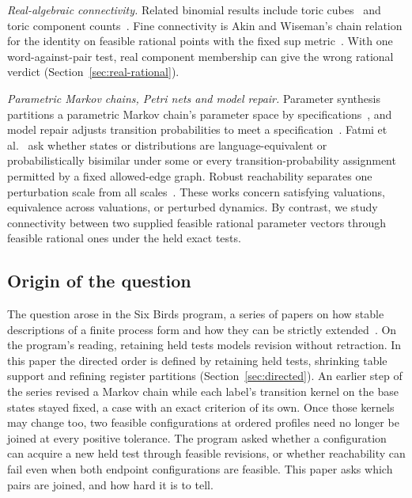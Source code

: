 \emph{Real-algebraic connectivity.} Related binomial results include toric
cubes~\cite{toriccubes,basugabrielovvorobjov} and toric component
counts~\cite{soprunovasottile}. Fine connectivity is Akin and Wiseman's chain
relation for the identity on feasible rational points with the fixed sup
metric~\cite[Section~3]{akinwiseman}. With one word-against-pair test, real
component membership can give the wrong rational verdict
(Section~\ref{sec:real-rational}).

\emph{Parametric Markov chains, Petri nets and model repair.} Parameter
synthesis partitions a parametric Markov chain's parameter space by
specifications~\cite{jungesetal2019,hutschenreiterbaierklein}, and model
repair adjusts transition probabilities to meet a specification~\cite{ceska}.
Fatmi et al.~\cite{fatmikiefermainparker} ask whether states or distributions
are language-equivalent or probabilistically bisimilar under some or every
transition-probability assignment permitted by a fixed allowed-edge graph.
Robust reachability separates one perturbation scale from all
scales~\cite{asarinbouajjani,bournezgracahainry,blancbournez,blanc}. These
works concern satisfying valuations, equivalence across valuations, or
perturbed dynamics. By contrast, we study connectivity between two supplied
feasible rational parameter vectors through feasible rational ones under the
held exact tests.

\subsection{Origin of the question}\label{sec:origin}

The question arose in the Six Birds program, a series of papers on how
stable descriptions of a finite process form and how they can be strictly
extended~\cite[Sections~4.1--4.2]{foundations1}.
On the program's reading, retaining held tests models revision without
retraction. In this paper the directed order is defined by retaining held
tests, shrinking table support and refining register partitions
(Section~\ref{sec:directed}).
An earlier step of the series revised a Markov chain while each label's
transition kernel on the base states stayed fixed, a case with an exact
criterion of its own. Once those kernels may change too, two feasible
configurations at ordered profiles need no longer be joined at every
positive tolerance. The program asked whether a configuration can acquire a
new held test through feasible revisions, or whether reachability can fail
even when both endpoint configurations are feasible. This paper asks which
pairs are joined, and how hard it is to tell.

